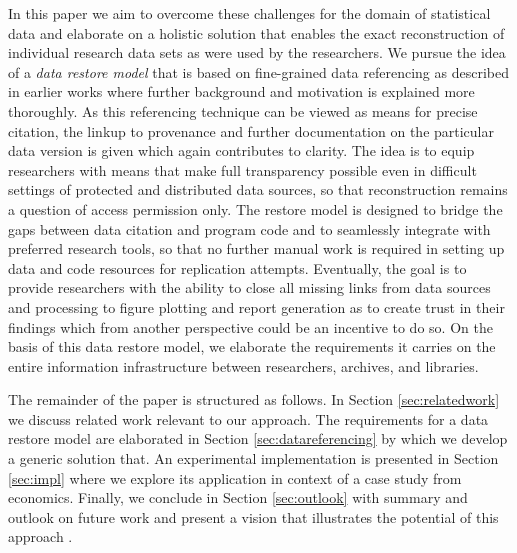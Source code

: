 \documentclass{acm_proc_article-sp}
\begin{document}
In this paper we aim to overcome these challenges for the domain of statistical data and elaborate on a holistic solution that enables the exact reconstruction of individual research data sets as were used by the researchers.
We pursue the idea of a \emph{data restore model} that is based on fine-grained data referencing as described in earlier works \cite{BahlsTochtermann_2012}
where further background and motivation is explained more thoroughly.
As this referencing technique can be viewed as means for precise citation, the linkup to provenance and further documentation on the particular data version is given which again contributes to clarity.
The idea is to equip researchers with means that make full transparency possible even in difficult settings of protected and distributed data sources, so that reconstruction remains a question of access permission only.
The restore model is designed to bridge the gaps between data citation and program code and to seamlessly integrate with preferred research tools, so that no further manual work is required in setting up data and code resources for replication attempts.
Eventually, the goal is to provide researchers with the ability to close all missing links from data sources and processing to figure plotting and report generation as to create trust in their findings which from another perspective could be an incentive to do so.
On the basis of this data restore model, we elaborate the requirements it carries on the entire information infrastructure between researchers, archives, and libraries.


 
The remainder of the paper is structured as follows. 
In Section \ref{sec:relatedwork} we discuss related work relevant to our approach. 
The requirements for a data restore model are elaborated in Section \ref{sec:datareferencing} by which we develop a generic solution that.
An experimental implementation is presented in Section \ref{sec:impl} where we explore its application in context of a case study from economics.
Finally, we conclude in Section \ref{sec:outlook} with summary and outlook on future work and present a vision that illustrates the potential of this approach .
\end{document}

